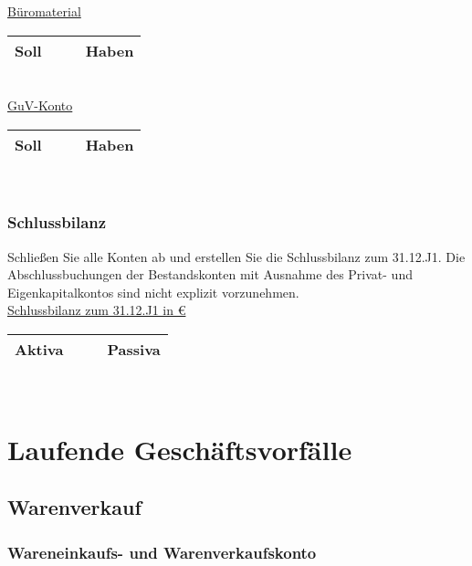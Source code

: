 \documentclass[paper=a4, fontsize=11pt]{scrartcl}
\numberwithin{equation}{section}
\numberwithin{figure}{section}
\numberwithin{table}{section}
\begin{document}
\underline{Büromaterial}

\begin{tabular}{cc|cc}
\hline
Soll & & & Haben \\
\hline
\end{tabular}
\\

\underline{GuV-Konto}

\begin{tabular}{cc|cc}
\hline
Soll & & & Haben \\
\hline
\end{tabular}
\\


\subsubsection{Schlussbilanz}

Schließen Sie alle Konten ab und erstellen Sie die Schlussbilanz zum 31.12.J1. Die Abschlussbuchungen der Bestandskonten mit Ausnahme des Privat- und Eigenkapitalkontos sind nicht explizit vorzunehmen. \\

\underline{Schlussbilanz zum 31.12.J1 in €}

\begin{tabular}{cc|cc}
\hline
Aktiva & & & Passiva \\
\hline
\end{tabular}
\\


\section{Laufende Geschäftsvorfälle}


\subsection{Warenverkauf}


\subsubsection{Wareneinkaufs- und Warenverkaufskonto}
\end{document}
